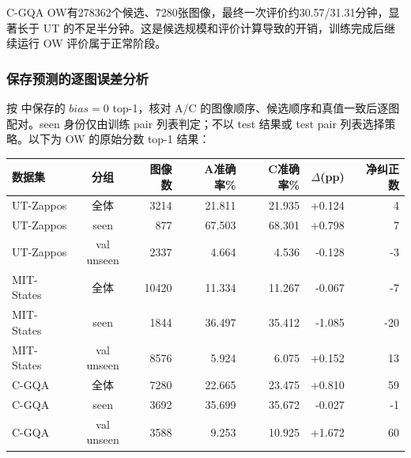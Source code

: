 \documentclass[12pt,a4paper,UTF8]{ctexart}
\newcommand{\file}[1]{\texttt{\detokenize{#1}}}
\newenvironment{reporttable}{\par\smallskip\begingroup\small\centering}{\par\endgroup\smallskip}
\begin{document}
C-GQA OW有278362个候选、7280张图像，最终一次评价约30.57/31.31分钟，显著长于 UT 的不足半分钟。这是候选规模和评价计算导致的开销，训练完成后继续运行 OW 评价属于正常阶段。
\subsubsection{保存预测的逐图误差分析}
按 \file{labels.npz} 中保存的 $bias=0$ top-1，核对 A/C 的图像顺序、候选顺序和真值一致后逐图配对。seen 身份仅由训练 pair 列表判定；不以 test 结果或 test pair 列表选择策略。以下为 OW 的原始分数 top-1 结果：

\begin{reporttable}

\footnotesize

\begin{tabularx}{\linewidth}{|Y|c|r|r|r|r|r|}
\hline

\textbf{数据集} & \textbf{分组} & \textbf{图像数} & \textbf{A准确率\%} & \textbf{C准确率\%} & \textbf{$\Delta$(pp)} & \textbf{净纠正数} \\ \hline

UT-Zappos & 全体 & 3214 & 21.811 & 21.935 & +0.124 & 4 \\ \hline

UT-Zappos & seen & 877 & 67.503 & 68.301 & +0.798 & 7 \\ \hline

UT-Zappos & val unseen & 2337 & 4.664 & 4.536 & -0.128 & -3 \\ \hline

MIT-States & 全体 & 10420 & 11.334 & 11.267 & -0.067 & -7 \\ \hline

MIT-States & seen & 1844 & 36.497 & 35.412 & -1.085 & -20 \\ \hline

MIT-States & val unseen & 8576 & 5.924 & 6.075 & +0.152 & 13 \\ \hline

C-GQA & 全体 & 7280 & 22.665 & 23.475 & +0.810 & 59 \\ \hline

C-GQA & seen & 3692 & 35.699 & 35.672 & -0.027 & -1 \\ \hline

C-GQA & val unseen & 3588 & 9.253 & 10.925 & +1.672 & 60 \\ \hline

\end{tabularx}\end{reporttable}
\end{document}
